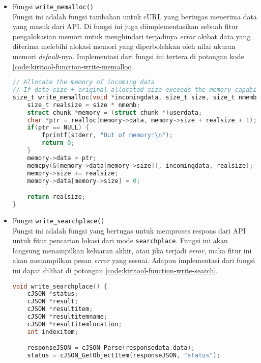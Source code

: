 \begin{itemize}[listparindent=\parindent]
	\item Fungsi \verb|write_memalloc()| \\
	Fungsi ini adalah fungsi tambahan untuk cURL yang bertugas menerima data yang masuk dari API. Di fungsi ini juga diimplementasikan sebuah fitur pengalokasian memori untuk menghindari terjadinya \textit{error} akibat data yang diterima melebihi alokasi memori yang diperbolehkan oleh nilai ukuran memori \textit{default}-nya. Implementasi dari fungsi ini tertera di potongan kode \ref{code:kiritool-function-write-memalloc}.
	
	\begin{lstlisting}[language=C, caption=Implementasi fungsi write\textunderscore memalloc(), label=code:kiritool-function-write-memalloc]
// Allocate the memory of incoming data
// If data size + original allocated size exceeds the memory capability, print an error.
size_t write_memalloc(void *incomingdata, size_t size, size_t nmemb, void *userdata) {
    size_t realsize = size * nmemb;
    struct chunk *memory = (struct chunk *)userdata;
    char *ptr = realloc(memory->data, memory->size + realsize + 1);
    if(ptr == NULL) {
        fprintf(stderr, "Out of memory!\n");
        return 0;
    } 
    memory->data = ptr;
    memcpy(&(memory->data[memory->size]), incomingdata, realsize);
    memory->size += realsize;
    memory->data[memory->size] = 0;

    return realsize;
}
	\end{lstlisting}
	
	\item Fungsi \verb|write_searchplace()| \\
	Fungsi ini adalah fungsi yang bertugas untuk memproses respons dari API untuk fitur pencarian lokasi dari mode \verb|searchplace|. Fungsi ini akan langsung menampilkan keluaran akhir, atau jika terjadi \textit{error}, maka fitur ini akan menampilkan pesan \textit{error} yang sesuai. Adapun implementasi dari fungsi ini dapat dilihat di potongan \ref{code:kiritool-function-write-search}.
	
	\begin{lstlisting}[language=C, caption=Implementasi fungsi write\textunderscore seachplace(), label=code:kiritool-function-write-search]
void write_searchplace() {
    cJSON *status;
    cJSON *result;
    cJSON *resultitem;
    cJSON *resultitemname;
    cJSON *resultitemlocation;
    int indexitem;

    responseJSON = cJSON_Parse(responsedata.data);
    status = cJSON_GetObjectItem(responseJSON, "status");
    

\end{lstlisting}
\end{itemize}
